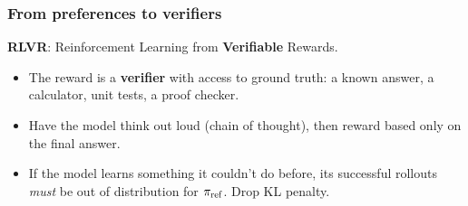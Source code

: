 \begin{frame}
    \frametitle{From preferences to verifiers}
    \textbf{RLVR}: Reinforcement Learning from \textbf{Verifiable} Rewards.
    \begin{itemize}
        \item The reward is a \textbf{verifier} with access to ground truth:
        a known answer, a calculator, unit tests, a proof checker.
        \item Have the model think out loud (chain of thought), then reward based only on the final answer.

    \pause
        \item If the model learns something it couldn't do before,
        its successful rollouts \textit{must} be out of distribution for $\pi_{\text{ref}}$.
        Drop KL penalty.
    \end{itemize}
\end{frame}

